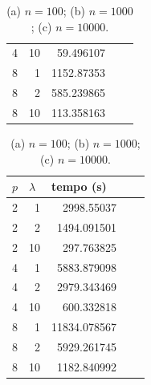 \documentclass[a4paper,12pt]{article}
\begin{document}
\begin{table}[]
\begin{tabular}{rrrll}
                4                       & 10                          & 59.496107                     \\
                8                       & 1                           & 1152.87353                    \\
                8                       & 2                           & 585.239865                    \\
                8                       & 10                          & 113.358163                    \\ \hline
            \end{tabular}
            \begin{tabular}{rrrll}
                \hline
                \multicolumn{1}{l}{$p$} & \multicolumn{1}{l}{$\lambda$} & \multicolumn{1}{l}{tempo (s)} \\ \hline
                2                       & 1                             & 2998.55037                    \\
                2                       & 2                             & 1494.091501                   \\
                2                       & 10                            & 297.763825                    \\
                4                       & 1                             & 5883.879098                   \\
                4                       & 2                             & 2979.343469                   \\
                4                       & 10                            & 600.332818                    \\
                8                       & 1                             & 11834.078567                  \\
                8                       & 2                             & 5929.261745                   \\
                8                       & 10                            & 1182.840992                   \\\hline
            \end{tabular}
            \caption{(a) $n = 100$; (b) $n = 1000$; (c) $n = 10000$.}
            \label{my-label}
        \end{table}

        
        
\end{document}
